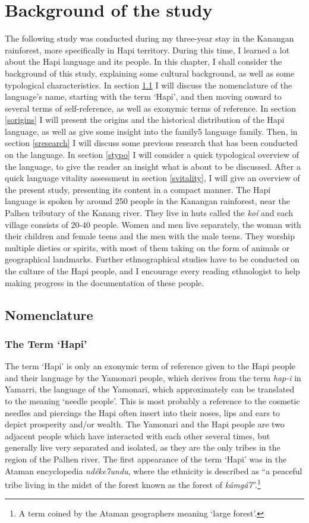 \documentclass[a4paper, 12pt, oneside]{memoir}
\newcommand{\family}{family5 }
\newcommand{\peoplef}{Hapi }
\newcommand{\emh}[1]{\textit{#1}}
\begin{document}
\chapter{Background of the study}
The following study was conducted during my three-year stay in the Kanangan rainforest, more specifically in Hapi territory. During this time, I learned a lot about the Hapi language and its people. In this chapter, I shall consider the background of this study, explaining some cultural background, as well as some typological characteristics. In section \ref{snmc} I will discuss the nomenclature of the language's name, starting with the term `Hapi', and then moving onward to several terms of self-reference, as well as exonymic terms of reference. In section \ref{sorigins} I will present the origins and the historical distribution of the Hapi language, as well as give some insight into the \family language family. Then, in section \ref{sresearch} I will discuss some previous research that has been conducted on the language. In section \ref{stypo} I will consider a quick typological overview of the language, to give the reader an insight what is about to be discussed. After a quick language vitality assessment in section \ref{svitality}, I will give an overview of the present study, presenting its content in a compact manner.
The Hapi language is spoken by around 250 people in the Kanangan rainforest, near the Palhen tributary of the Kanang river. They live in huts called the \emh{koí} and each village consists of 20-40 people. Women and men live separately, the woman with their children and female teens and the men with the male teens. They worship multiple dieties or spirits, with most of them taking on the form of animals or geographical landmarks. Further ethnographical studies have to be conducted on the culture of the \peoplef people, and I encourage every reading ethnologist to help making progress in the documentation of these people. 

\section{Nomenclature}\label{snmc}
\subsection{The Term `Hapi'}
The term `Hapi' is only an exonymic term of reference given to the \peoplef people and their language by the Yamonari people, which derives from the term \emh{hap-i} in Yamarri, the language of the Yamonarï, which approximately can be translated to the meaning `needle people'. This is most probably a reference to the cosmetic needles and piercings the \peoplef often insert into their noses, lips and ears to depict prosperity and/or wealth. The Yamonari and the \peoplef people are two adjacent people which have interacted with each other several times, but generally live very separated and isolated, as they are the only tribes in the region of the Palhen river. 
The first appearance of the term `Hapi' was in the Ataman encyclopedia \textit{ndéke7undu}, where the ethnicity is described as ``a peaceful tribe living in the midst of the forest known as the forest of \textit{kámgá7}''.\footnote{A term coined by the Ataman geographers meaning `large forest'.}
\end{document}
